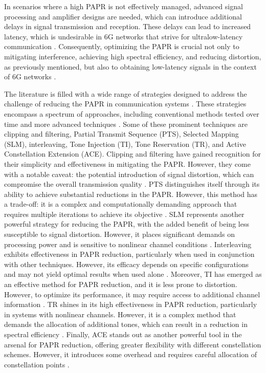 \documentclass[conference]{IEEEtran}
\begin{document}
In scenarios where a high PAPR is not effectively managed, advanced signal processing and amplifier designs are needed, which can introduce additional delays in signal transmission and reception. These delays can lead to increased latency, which is undesirable in 6G networks that strive for ultralow-latency communication \cite{b48}. Consequently, optimizing the PAPR is crucial not only to mitigating interference, achieving high spectral efficiency, and reducing distortion, as previously mentioned, but also to obtaining low-latency signals in the context of 6G networks \cite{b49}.

The literature is filled with a wide range of strategies designed to address the challenge of reducing the PAPR in communication systems \cite{b50}. These strategies encompass a spectrum of approaches, including conventional methods tested over time and more advanced techniques \cite{b51}. Some of these prominent techniques are clipping and filtering, Partial Transmit Sequence (PTS), Selected Mapping (SLM), interleaving, Tone Injection (TI), Tone Reservation (TR), and Active Constellation Extension (ACE). Clipping and filtering have gained recognition for their simplicity and effectiveness in mitigating the PAPR. However, they come with a notable caveat: the potential introduction of signal distortion, which can compromise the overall transmission quality \cite{b52, b53}. PTS distinguishes itself through its ability to achieve substantial reductions in the PAPR. However, this method has a trade-off: it is a complex and computationally demanding approach that requires multiple iterations to achieve its objective \cite{b54, b55}. SLM represents another powerful strategy for reducing the PAPR, with the added benefit of being less susceptible to signal distortion. However, it places significant demands on processing power and is sensitive to nonlinear channel conditions \cite{b56, b57}. Interleaving exhibits effectiveness in PAPR reduction, particularly when used in conjunction with other techniques. However, its efficacy depends on specific configurations and may not yield optimal results when used alone \cite{b58, b59}. Moreover, TI has emerged as an effective method for PAPR reduction, and it is less prone to distortion. However, to optimize its performance, it may require access to additional channel information \cite{b60}. TR shines in its high effectiveness in PAPR reduction, particularly in systems with nonlinear channels. However, it is a complex method that demands the allocation of additional tones, which can result in a reduction in spectral efficiency \cite{b61}. Finally, ACE stands out as another powerful tool in the arsenal for PAPR reduction, offering greater flexibility with different constellation schemes. However, it introduces some overhead and requires careful allocation of constellation points \cite{b62}.
\end{document}
